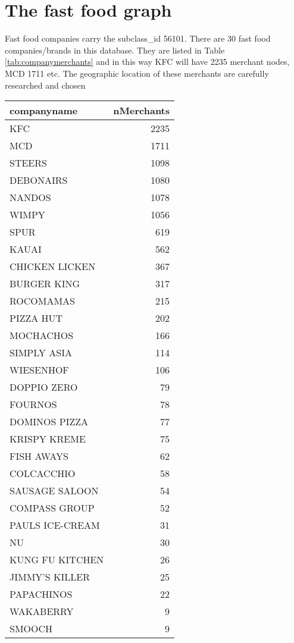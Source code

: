 \section{The fast food graph}

Fast food companies carry the subclass\_id 56101.  There are 30 fast food companies/brands in this database.  They are listed in Table \ref{tab:companymerchants} and in this way KFC will have 2235 merchant nodes, MCD 1711 etc.  The geographic location of these merchants are carefully researched and chosen 

\begin{center}
\begin{table}[ht!]
    \centering
    \begin{tabular}{lr}
    \toprule
         companyname &  nMerchants \\
    \midrule
                 KFC &        2235 \\
                 MCD &        1711 \\
              STEERS &        1098 \\
           DEBONAIRS &        1080 \\
              NANDOS &        1078 \\
               WIMPY &        1056 \\
                SPUR &         619 \\
               KAUAI &         562 \\
      CHICKEN LICKEN &         367 \\
         BURGER KING &         317 \\
           ROCOMAMAS &         215 \\
           PIZZA HUT &         202 \\
           MOCHACHOS &         166 \\
         SIMPLY ASIA &         114 \\
           WIESENHOF &         106 \\
         DOPPIO ZERO &          79 \\
             FOURNOS &          78 \\
       DOMINOS PIZZA &          77 \\
        KRISPY KREME &          75 \\
          FISH AWAYS &          62 \\
          COLCACCHIO &          58 \\
      SAUSAGE SALOON &          54 \\
       COMPASS GROUP &          52 \\
     PAULS ICE-CREAM &          31 \\
                  NU &          30 \\
     KUNG FU KITCHEN &          26 \\
      JIMMY'S KILLER &          25 \\
          PAPACHINOS &          22 \\
           WAKABERRY &           9 \\
              SMOOCH &           9 \\
    \bottomrule


\end{tabular}
\end{table}
\end{center}
